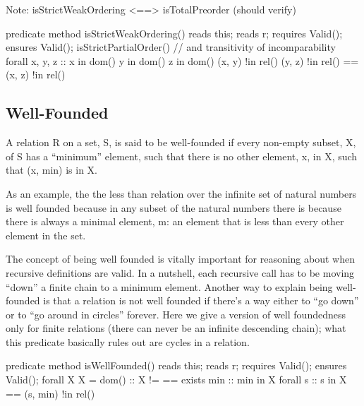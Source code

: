 \documentclass[letterpaper,10pt,english]{sphinxmanual}
\begin{document}
Note: isStrictWeakOrdering \textless{}==\textgreater{} isTotalPreorder (should verify)

\begin{sphinxVerbatim}[commandchars=\\\{\}]
predicate method isStrictWeakOrdering()
    reads this;
    reads r;
    requires Valid();
    ensures Valid();
\PYGZob{}
    isStrictPartialOrder() \PYGZam{}\PYGZam{}
    // and transitivity of incomparability
    forall x, y, z :: x in dom() \PYGZam{}\PYGZam{} y in dom() \PYGZam{}\PYGZam{} z in dom() \PYGZam{}\PYGZam{}
       (x, y) !in rel() \PYGZam{}\PYGZam{} (y, z) !in rel() ==\PYGZgt{} (x, z) !in rel()
\PYGZcb{}
\end{sphinxVerbatim}


\subsection{Well-Founded}
\label{\detokenize{08-relations:well-founded}}
A relation R on a set, S, is said to be well-founded if every
non-empty subset, X, of S has a “minimum” element, such that there is
no other element, x, in X, such that (x, min) is in X.

As an example, the the less than relation over the infinite set of
natural numbers is well founded because in any subset of the natural
numbers there is because there is always a minimal element, m: an
element that is less than every other element in the set.

The concept of being well founded is vitally important for reasoning
about when recursive definitions are valid.  In a nutshell, each
recursive call has to be moving “down” a finite chain to a minimum
element. Another way to explain being well-founded is that a relation
is not well founded if there’s a way either to “go down” or to “go
around in circles” forever. Here we give a version of well foundedness
only for finite relations (there can never be an infinite descending
chain); what this predicate basically rules out are cycles in a
relation.

\begin{sphinxVerbatim}[commandchars=\\\{\}]
predicate method isWellFounded()
    reads this;
    reads r;
    requires Valid();
    ensures Valid();
\PYGZob{}
    forall X \textbar{} X \PYGZlt{}= dom() ::
        X != \PYGZob{}\PYGZcb{} ==\PYGZgt{}
            exists min :: min in X \PYGZam{}\PYGZam{}
                forall s :: s in X ==\PYGZgt{} (s, min) !in rel()
\PYGZcb{}
\end{sphinxVerbatim}
\end{document}
